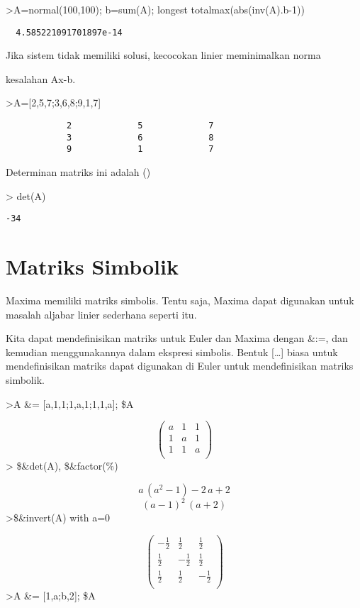\documentclass[
]{book}
\begin{document}
\textgreater A=normal(100,100); b=sum(A); longest totalmax(abs(inv(A).b-1))

\begin{verbatim}
  4.585221091701897e-14 
\end{verbatim}

Jika sistem tidak memiliki solusi, kecocokan linier meminimalkan norma

kesalahan Ax-b.

\textgreater A={[}2,5,7;3,6,8;9,1,7{]}

\begin{verbatim}
            2             5             7 
            3             6             8 
            9             1             7 
\end{verbatim}

Determinan matriks ini adalah ()

\textgreater{} det(A)

\begin{verbatim}
-34
\end{verbatim}

\chapter{Matriks Simbolik}\label{matriks-simbolik}

Maxima memiliki matriks simbolis. Tentu saja, Maxima dapat digunakan untuk masalah aljabar linier sederhana seperti itu.

Kita dapat mendefinisikan matriks untuk Euler dan Maxima dengan \&:=, dan kemudian menggunakannya dalam ekspresi simbolis. Bentuk {[}\ldots{]} biasa untuk mendefinisikan matriks dapat digunakan di Euler untuk mendefinisikan matriks simbolik.

\textgreater A \&= {[}a,1,1;1,a,1;1,1,a{]}; \$A

\[\begin{pmatrix}a & 1 & 1 \\ 1 & a & 1 \\ 1 & 1 & a \\ \end{pmatrix}\]\textgreater{} \$\&det(A), \$\&factor(\%)

\[a\,\left(a^2-1\right)-2\,a+2\]\[\left(a-1\right)^2\,\left(a+2\right)\]\textgreater\$\&invert(A) with a=0

\[\begin{pmatrix}-\frac{1}{2} & \frac{1}{2} & \frac{1}{2} \\ \frac{1
 }{2} & -\frac{1}{2} & \frac{1}{2} \\ \frac{1}{2} & \frac{1}{2} & -
 \frac{1}{2} \\ \end{pmatrix}\]\textgreater A \&= {[}1,a;b,2{]}; \$A
\end{document}
